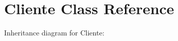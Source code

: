 \hypertarget{classCliente}{}\section{Cliente Class Reference}
\label{classCliente}


Inheritance diagram for Cliente\+:
